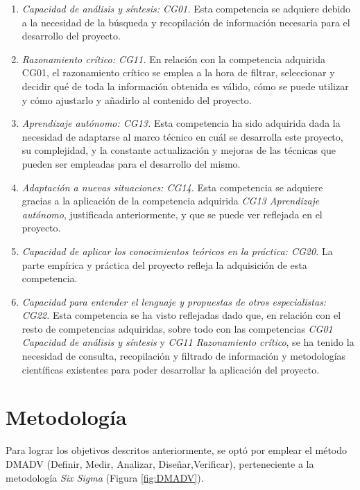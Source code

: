\begin{enumerate}
  \item \textit{Capacidad de análisis y síntesis: CG01.} Esta competencia se adquiere debido a la necesidad de la búsqueda y recopilación de información necesaria para el desarrollo del proyecto.
  \item \textit{Razonamiento crítico: CG11.} En relación con la competencia adquirida CG01, el razonamiento crítico se emplea a la hora de filtrar, seleccionar y decidir qué de toda la información obtenida es válido, cómo se puede utilizar y cómo ajustarlo y añadirlo al contenido del proyecto.
  \item \textit{Aprendizaje autónomo: CG13.} Esta competencia ha sido adquirida dada  la necesidad de adaptarse al marco técnico en cuál se desarrolla este proyecto, su complejidad, y la constante actualización y mejoras de las técnicas que pueden ser empleadas para el desarrollo del mismo.
  \item \textit{Adaptación a nuevas situaciones: CG14.} Esta competencia se adquiere gracias a la aplicación de la competencia adquirida \textit{CG13 Aprendizaje autónomo}, justificada anteriormente, y que se puede ver reflejada en el proyecto.
  \item \textit{Capacidad de aplicar los conocimientos teóricos en la práctica: CG20.} La parte empírica y práctica del proyecto refleja la adquisición de esta competencia.
  \item \textit{Capacidad para entender el lenguaje y propuestas de otros especialistas: CG22.} Esta competencia se ha visto reflejadas dado que, en relación con el resto de competencias adquiridas, sobre todo con las competencias \textit{CG01 Capacidad de análisis y síntesis} y \textit{CG11 Razonamiento crítico}, se ha tenido la necesidad de consulta, recopilación y filtrado de información y metodologías científicas existentes para poder desarrollar la aplicación del proyecto.
\end{enumerate} 


\section{Metodología}
\label{sec:metodologia}

Para lograr los objetivos descritos anteriormente, se optó por emplear el método DMADV (Definir, Medir, Analizar, Diseñar,Verificar), perteneciente a la metodología \textit{Six Sigma} (Figura \ref{fig:DMADV}). \\

